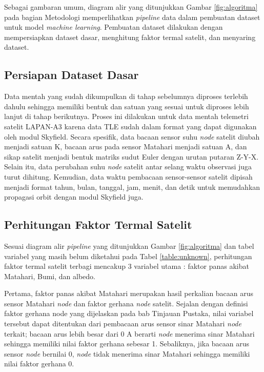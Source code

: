 Sebagai gambaran umum, diagram alir yang ditunjukkan Gambar \ref{fig:algoritma}
pada bagian Metodologi memperlihatkan \textit{pipeline} data dalam pembuatan
dataset untuk model \textit{machine learning}. Pembuatan dataset dilakukan
dengan mempersiapkan dataset dasar, menghitung faktor termal satelit, dan
menyaring dataset.

\subsection{Persiapan Dataset Dasar}

Data mentah yang sudah dikumpulkan di tahap sebelumnya diproses terlebih dahulu
sehingga memiliki bentuk dan satuan yang sesuai untuk diproses lebih lanjut di
tahap berikutnya. Proses ini dilakukan untuk data mentah telemetri satelit
LAPAN-A3 karena data TLE sudah dalam format yang dapat digunakan oleh modul
Skyfield. Secara spesifik, data bacaan sensor suhu \textit{node} satelit diubah
menjadi satuan K, bacaan arus pada sensor Matahari menjadi satuan A, dan sikap
satelit menjadi bentuk matriks sudut Euler dengan urutan putaran Z-Y-X. Selain
itu, data perubahan suhu \textit{node} satelit antar selang waktu observasi
juga turut dihitung. Kemudian, data waktu pembacaan sensor-sensor satelit
dipisah menjadi format tahun, bulan, tanggal, jam, menit, dan detik untuk
memudahkan propagasi orbit dengan modul Skyfield juga.

\subsection{Perhitungan Faktor Termal Satelit}

Sesuai diagram alir \textit{pipeline} yang ditunjukkan Gambar \ref{fig:algoritma}
dan tabel variabel yang masih belum diketahui pada Tabel \ref{table:unknown},
perhitungan faktor termal satelit terbagi mencakup 3 variabel utama : faktor
panas akibat Matahari, Bumi, dan albedo.

Pertama, faktor panas akibat Matahari merupakan hasil perkalian bacaan arus
sensor Matahari \textit{node} dan faktor gerhana \textit{node} satelit. Sejalan
dengan definisi faktor gerhana node yang dijelaskan pada bab Tinjauan Pustaka,
nilai variabel tersebut dapat ditentukan dari pembacaan arus sensor sinar
Matahari \textit{node} terkait; bacaan arus lebih besar dari 0 A berarti
\textit{node} menerima sinar Matahari sehingga memiliki nilai faktor gerhana
sebesar 1. Sebaliknya, jika bacaan arus sensor \textit{node} bernilai 0,
\textit{node} tidak menerima sinar Matahari sehingga memiliki nilai faktor
gerhana 0.

